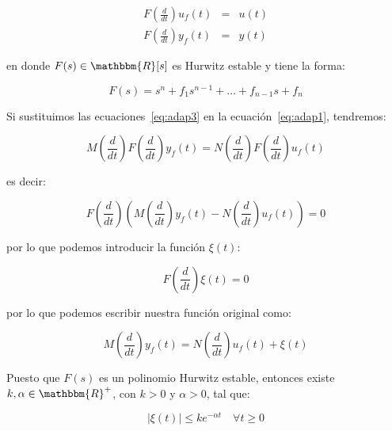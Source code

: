         \begin{eqnarray} \label{eq:adap3}
            F \left( \frac{d}{dt} \right) u_f (t) & = & u(t) \nonumber \\
            F \left( \frac{d}{dt} \right) y_f (t) & = & y(t)
        \end{eqnarray}

        en donde $F(s) \in \mathbbm{R}[s]$ es Hurwitz estable y tiene la forma:

        \begin{equation*}
            F(s) = s^n + f_1 s^{n-1} + \dots + f_{n-1} s + f_n
        \end{equation*}

        Si sustituimos las ecuaciones~\ref{eq:adap3} en la ecuación~\ref{eq:adap1}, tendremos:

        \begin{equation*}
            M \left( \frac{d}{dt} \right) F \left( \frac{d}{dt} \right) y_f (t) = N \left( \frac{d}{dt} \right) F \left( \frac{d}{dt} \right) u_f (t)
        \end{equation*}

        es decir:

        \begin{equation*}
            F \left( \frac{d}{dt} \right) \left( M \left( \frac{d}{dt} \right)  y_f (t) - N \left( \frac{d}{dt} \right) u_f (t) \right) = 0
        \end{equation*}

        por lo que podemos introducir la función $\xi(t)$:

        \begin{equation*}
            F \left( \frac{d}{dt} \right) \xi(t) = 0
        \end{equation*}

        por lo que podemos escribir nuestra función original como:

        \begin{equation} \label{eq:adap4}
            M \left( \frac{d}{dt} \right) y_f(t) = N \left( \frac{d}{dt} \right) u_f(t) + \xi(t)
        \end{equation}

        Puesto que $F(s)$ es un polinomio Hurwitz estable, entonces existe $k, \alpha \in \mathbbm{R}^+$, con $k > 0$ y $\alpha > 0$, tal que:

        \begin{equation*}
            |\xi(t)| \le k e^{- \alpha t} \quad \forall t \ge 0
        \end{equation*}

